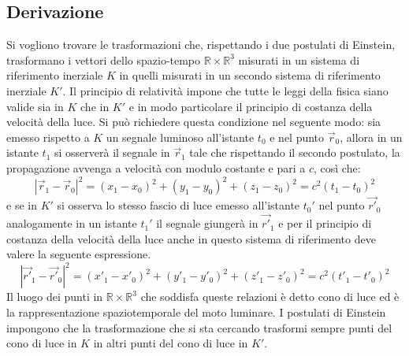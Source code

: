 \subsection{Derivazione}
Si vogliono trovare le trasformazioni che, rispettando i due postulati di Einstein, trasformano i vettori dello spazio-tempo $\mathbb{R}\times\mathbb{R}^3$  misurati in un sistema di riferimento inerziale $K$ in quelli misurati in un secondo sistema di riferimento inerziale $K'$. Il principio di relatività impone che tutte le leggi della fisica siano valide sia in $K$ che in $K'$ e in modo particolare il principio di costanza della velocità della luce. Si può richiedere questa condizione nel seguente modo: sia emesso rispetto a $K$ un segnale luminoso all'istante $t_0$ e nel punto $\vec{r}_0$, allora in un istante $t_1$ si osserverà il segnale in $\vec{r}_1$ tale che rispettando il secondo postulato, la propagazione avvenga a velocità con modulo costante e pari a $c$, così che:
\begin{equation}
    |\vec{r}_1-\vec{r}_0|^2=(x_1-x_0)^2+(y_1-y_0)^2+(z_1-z_0)^2=c^2(t_1-t_0)^2
    \label{luceK}
\end{equation}
e se in $K'$ si osserva lo stesso fascio di luce emesso all'istante $t_0'$ nel punto $\vec{r'}_0$ analogamente in un istante $t_1'$ il segnale giungerà in $\vec{r'}_1$ e per il principio di costanza della velocità della luce anche in questo sistema di riferimento deve valere la seguente espressione.
\begin{equation}
    |\vec{r'}_1-\vec{r'}_0|^2=(x'_1-x'_0)^2+(y'_1-y'_0)^2+(z'_1-z'_0)^2=c^2(t'_1-t'_0)^2
    \label{luceK'}
\end{equation}
Il luogo dei punti in $\mathbb{R}\times\mathbb{R}^3$ che soddisfa queste relazioni è detto cono di luce ed è la rappresentazione spaziotemporale del moto luminare. I postulati di Einstein impongono che la trasformazione che si sta cercando trasformi sempre punti del cono di luce in $K$ in altri punti del cono di luce in $K'$.\\ 


